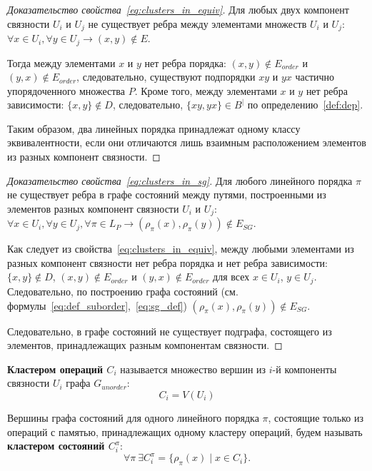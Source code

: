 \begin{proof}[Доказательство свойства~\ref{eq:clusters_in_equiv}]
  Для любых двух компонент связности $U_i$ и $U_j$ не существует
  ребра между элементами множеств $U_i$ и $U_j$: $\forall x \in U_i,
  \forall y \in U_j \rightarrow (x, y) \not \in E$.

  Тогда между элементами $x$ и $y$ нет ребра порядка: $(x, y) \not
  \in E_{order}$ и $(y, x) \not \in E_{order}$, следовательно,
  существуют подпорядки $xy$ и $yx$ частично упорядоченного множества
  $P$. Кроме того, между элементами $x$ и $y$ нет ребра зависимости:
  $\{x, y\} \not \in D$, следовательно, $\{xy, yx\} \in B^{|}$ по
  определению~\ref{def:dep}.

  Таким образом, два линейных порядка принадлежат одному классу
  эквивалентности, если они отличаются лишь взаимным расположением
  элементов из разных компонент связности.
\end{proof}

\begin{proof}[Доказательство свойства~\ref{eq:clusters_in_sg}]
  Для любого линейного порядка $\pi$ не существует ребра в графе
  состояний между путями, построенными из элементов разных компонент
  связности $U_i$ и $U_j$: $\forall x \in U_i, \forall y \in U_j,
  \forall \pi \in L_P \rightarrow (\rho_\pi(x), \rho_\pi(y)) \not \in E_{SG}$.

  Как следует из свойства~\ref{eq:clusters_in_equiv}, между любыми
  элементами из разных компонент связности нет ребра порядка и нет
  ребра зависимости: $\{x, y\} \not \in D$, $(x, y) \not \in
  E_{order}$ и $(y, x) \not \in E_{order}$ для всех $x \in U_i$, $y
  \in U_j$. Следовательно, по построению графа состояний
  (см. формулы~\ref{eq:def_suborder},~\ref{eq:sg_def}) $(\rho_\pi(x),
  \rho_\pi(y)) \not \in E_{SG}$.

  Следовательно, в графе состояний не существует подграфа, состоящего
  из элементов, принадлежащих разным компонентам связности.
\end{proof}

\begin{definition}
  \textbf{Кластером операций $C_{i}$} называется множество вершин из
  $i$-й компоненты связности $U_i$ графа $G_{unorder}$:
  \begin{equation}
    C_{i} = V(U_i)
    \label{def:set_cluster}
  \end{equation}
\end{definition}

\begin{definition}
  Вершины графа состояний для одного линейного порядка $\pi$,
  состоящие только из операций с памятью, принадлежащих одному
  кластеру операций, будем называть \textbf{кластером состояний $C_{i}^{\pi}$}:
  \begin{equation}
    \forall \pi\ \exists C_{i}^{\pi} = \{ \rho_{\pi}(x) \mid x \in C_{i}\}.
    \label{def:st_cluster}
  \end{equation}
\end{definition}

